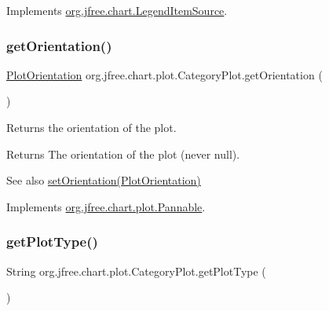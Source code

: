 Implements \mbox{\hyperlink{interfaceorg_1_1jfree_1_1chart_1_1_legend_item_source_a224409463c4f7a8ef0e2a9df337e6d3b}{org.\+jfree.\+chart.\+Legend\+Item\+Source}}.

\mbox{\label{classorg_1_1jfree_1_1chart_1_1plot_1_1_category_plot_ab765cf8f5fe1dcf554b1a223bbe2d158}} 
\subsubsection{\texorpdfstring{get\+Orientation()}{getOrientation()}}
{\footnotesize\ttfamily \mbox{\hyperlink{classorg_1_1jfree_1_1chart_1_1plot_1_1_plot_orientation}{Plot\+Orientation}} org.\+jfree.\+chart.\+plot.\+Category\+Plot.\+get\+Orientation (\begin{DoxyParamCaption}{ }\end{DoxyParamCaption})}

Returns the orientation of the plot.

\begin{DoxyReturn}{Returns}
The orientation of the plot (never {\ttfamily null}).
\end{DoxyReturn}
\begin{DoxySeeAlso}{See also}
\mbox{\hyperlink{classorg_1_1jfree_1_1chart_1_1plot_1_1_category_plot_a82408e08765664dc74ebd2852d91dfaf}{set\+Orientation(\+Plot\+Orientation)}} 
\end{DoxySeeAlso}


Implements \mbox{\hyperlink{interfaceorg_1_1jfree_1_1chart_1_1plot_1_1_pannable_a09abf56f19f9173a9c1898ba03efdf8b}{org.\+jfree.\+chart.\+plot.\+Pannable}}.

\mbox{\label{classorg_1_1jfree_1_1chart_1_1plot_1_1_category_plot_af0531c069575199b5df486ffd161d851}} 
\subsubsection{\texorpdfstring{get\+Plot\+Type()}{getPlotType()}}
{\footnotesize\ttfamily String org.\+jfree.\+chart.\+plot.\+Category\+Plot.\+get\+Plot\+Type (\begin{DoxyParamCaption}{ }\end{DoxyParamCaption})}

